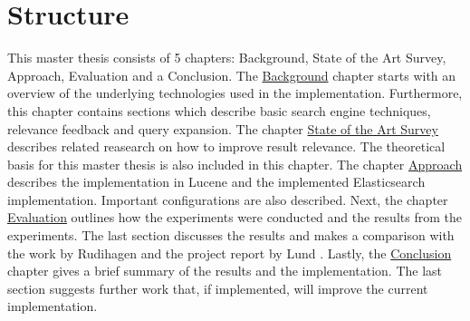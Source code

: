\section{Structure}
This master thesis consists of 5 chapters: Background, State of the Art Survey, Approach, Evaluation and a Conclusion.
The \hyperref[ch:background]{Background} chapter starts with an overview of the underlying technologies used in the implementation.
Furthermore, this chapter contains sections which describe basic search engine techniques, relevance feedback and query expansion.
The chapter \hyperref[ch:related-work]{State of the Art Survey} describes related reasearch on how to improve result relevance.
The theoretical basis for this master thesis is also included in this chapter.
The chapter \hyperref[ch:approach]{Approach} describes the implementation in Lucene and the implemented Elasticsearch implementation.
Important configurations are also described.
Next, the chapter \hyperref[ch:evaluation]{Evaluation} outlines how the experiments were conducted and the results from the experiments.
The last section discusses the results and makes a comparison with the work by Rudihagen \cite{master-thesis} and the project report by Lund \cite{project-report}.
Lastly, the \hyperref[ch:conclusion]{Conclusion} chapter gives a brief summary of the results and the implementation.
The last section suggests further work that, if implemented, will improve the current implementation.
